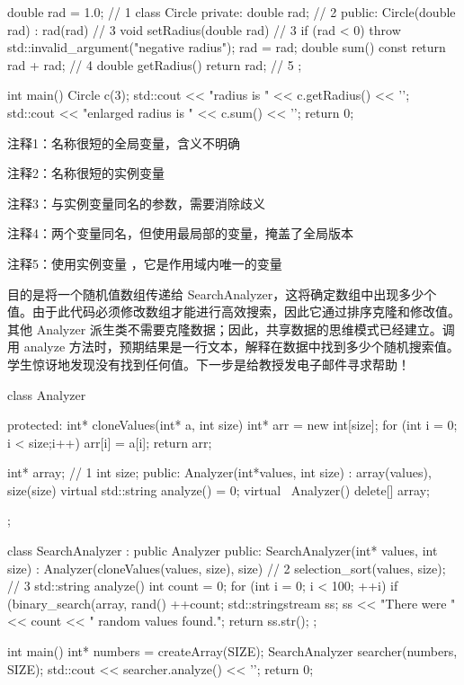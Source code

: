 
\begin{cpp}
double rad = 1.0; // 1
class Circle {
private:
  double rad; // 2
public:
  Circle(double rad) : rad(rad) {} // 3
  void setRadius(double rad) { // 3
    if (rad < 0)
      throw std::invalid_argument("negative radius");
    rad = rad;
  }
  double sum() const {
    return rad + rad; // 4
  }
  double getRadius() { return rad; } // 5
};

int main() {
  Circle c(3);
  std::cout << "radius is " << c.getRadius() << '\n';
  std::cout << "enlarged radius is " << c.sum() << '\n';
  return 0;
}
\end{cpp}

{\footnotesize
注释1：名称很短的全局变量，含义不明确

注释2：名称很短的实例变量

注释3：与实例变量同名的参数，需要消除歧义

注释4：两个变量同名，但使用最局部的变量，掩盖了全局版本

注释5：使用实例变量 ，它是作用域内唯一的变量
}

目的是将一个随机值数组传递给 SearchAnalyzer，这将确定数组中出现多少个值。由于此代码必须修改数组才能进行高效搜索，因此它通过排序克隆和修改值。其他 Analyzer 派生类不需要克隆数据；因此，共享数据的思维模式已经建立。调用 analyze 方法时，预期结果是一行文本，解释在数据中找到多少个随机搜索值。学生惊讶地发现没有找到任何值。下一步是给教授发电子邮件寻求帮助！


\begin{cpp}
class Analyzer{
protected:
  int* cloneValues(int* a, int size){
    int* arr = new int[size];
    for (int i = 0; i < size;i++)
    arr[i] = a[i];
    return arr;
  }

  int* array; // 1
  int size;
public:
  Analyzer(int*values, int size) : array(values), size(size) {}
  virtual std::string analyze() = 0;
  virtual ~Analyzer() { delete[] array; }
};

class SearchAnalyzer : public Analyzer{
public:
  SearchAnalyzer(int* values, int size) : Analyzer(cloneValues(values,
      size), size) { // 2
    selection_sort(values, size); // 3
  }
  std::string analyze() {
    int count = 0;
    for (int i = 0; i < 100; ++i)
      if (binary_search(array, rand() %
        ++count;
    std::stringstream ss;
    ss << "There were "<< count << " random values found.";
    return ss.str();
  }
};

int main() {
  int* numbers = createArray(SIZE);
  SearchAnalyzer searcher(numbers, SIZE);
  std::cout << searcher.analyze() << '\n';
  return 0;
}
\end{cpp}

